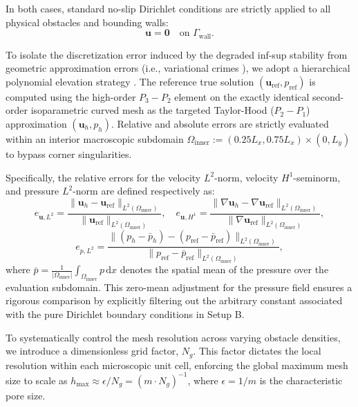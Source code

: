 \documentclass{elsarticle}
\begin{document}
In both cases, standard no-slip Dirichlet conditions are strictly applied to all physical obstacles and bounding walls:
\begin{equation} \label{eq:bc_wall}
    \mathbf{u} = \mathbf{0} \quad \text{on } \Gamma_{\mathrm{wall}}.
\end{equation}

To isolate the discretization error induced by the degraded inf-sup stability from geometric approximation errors (i.e., variational crimes \cite{brenner2008mathematical}), we adopt a hierarchical polynomial elevation strategy \cite{Bank1985}. The reference true solution $(\mathbf{u}_{\mathrm{ref}}, p_{\mathrm{ref}})$ is computed using the high-order $P_3-P_2$ element on the exactly identical second-order isoparametric curved mesh as the targeted Taylor-Hood ($P_2-P_1$) approximation $(\mathbf{u}_h, p_h)$. Relative and absolute errors are strictly evaluated within an interior macroscopic subdomain $\Omega_{\mathrm{inner}} := (0.25L_x, 0.75L_x) \times (0, L_y)$ to bypass corner singularities.

Specifically, the relative errors for the velocity $L^2$-norm, velocity $H^1$-seminorm, and pressure $L^2$-norm are defined respectively as:
\begin{equation} \label{eq:error_velocity}
    e_{\mathbf{u}, L^2} = \frac{\|\mathbf{u}_h - \mathbf{u}_{\mathrm{ref}}\|_{L^2(\Omega_{\mathrm{inner}})}}{\|\mathbf{u}_{\mathrm{ref}}\|_{L^2(\Omega_{\mathrm{inner}})}}, \quad
    e_{\mathbf{u}, H^1} = \frac{\|\nabla \mathbf{u}_h - \nabla \mathbf{u}_{\mathrm{ref}}\|_{L^2(\Omega_{\mathrm{inner}})}}{\|\nabla \mathbf{u}_{\mathrm{ref}}\|_{L^2(\Omega_{\mathrm{inner}})}},
\end{equation}
\begin{equation} \label{eq:error_pressure}
    e_{p, L^2} = \frac{\|(p_h - \bar{p}_h) - (p_{\mathrm{ref}} - \bar{p}_{\mathrm{ref}})\|_{L^2(\Omega_{\mathrm{inner}})}}{\|p_{\mathrm{ref}} - \bar{p}_{\mathrm{ref}}\|_{L^2(\Omega_{\mathrm{inner}})}},
\end{equation}
where $\bar{p} = \frac{1}{|\Omega_{\mathrm{inner}}|} \int_{\Omega_{\mathrm{inner}}} p \, \mathrm{d}x$ denotes the spatial mean of the pressure over the evaluation subdomain. This zero-mean adjustment for the pressure field ensures a rigorous comparison by explicitly filtering out the arbitrary constant associated with the pure Dirichlet boundary conditions in Setup B.

To systematically control the mesh resolution across varying obstacle densities, we introduce a dimensionless {grid factor}, $N_g$. This factor dictates the local resolution within each microscopic unit cell, enforcing the global maximum mesh size to scale as $h_{\max} \approx \epsilon / N_g = (m \cdot N_g)^{-1}$, where $\epsilon = 1/m$ is the characteristic pore size.
\end{document}
